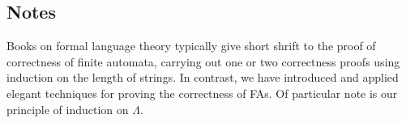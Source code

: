 \subsection{Notes}

Books on formal language theory typically give short shrift to the
proof of correctness of finite automata, carrying out one or two
correctness proofs using induction on the length of strings.  In
contrast, we have introduced and applied elegant techniques for
proving the correctness of FAs.  Of particular note is our principle
of induction on $\Lambda$.


